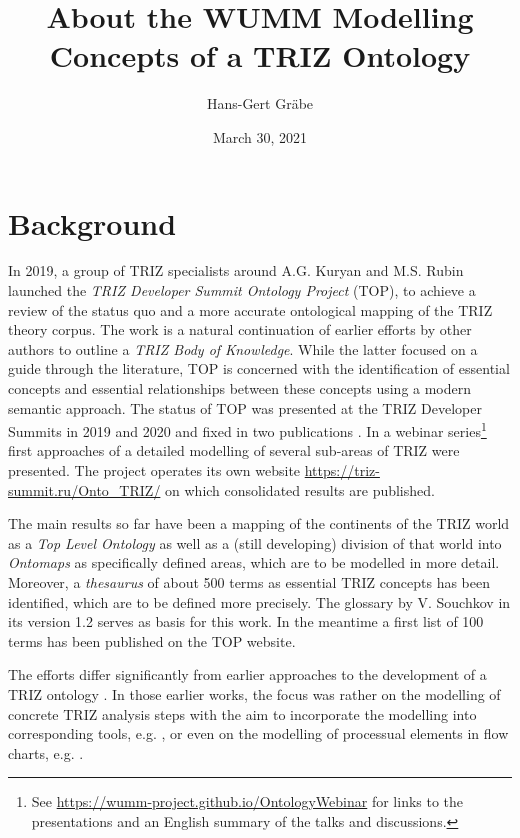 \documentclass[11pt,a4paper]{article}
\title{About the WUMM Modelling Concepts of a TRIZ Ontology}
\author{Hans-Gert Gr\"abe}
\date{March 30,  2021}
\begin{document}
\maketitle

\section{Background}

In 2019, a group of TRIZ specialists around A.G. Kuryan and M.S. Rubin
launched the \emph{TRIZ Developer Summit Ontology Project} (TOP), to achieve a
review of the status quo and a more accurate ontological mapping of the TRIZ
theory corpus. The work is a natural continuation of earlier efforts by other
authors \cite{TBK2007, TBK2012} to outline a \emph{TRIZ Body of Knowledge}.
While the latter focused on a guide through the literature, TOP is concerned
with the identification of essential concepts and essential relationships
between these concepts using a modern semantic approach. The status of TOP was
presented at the TRIZ Developer Summits in 2019 and 2020 and fixed in two
publications \cite{TOP2019, TOP2020}. In a webinar series\footnote{See
  \url{https://wumm-project.github.io/OntologyWebinar} for links to the
  presentations and an English summary of the talks and discussions.}  first
approaches of a detailed modelling of several sub-areas of TRIZ were
presented.  The project operates its own website
\url{https://triz-summit.ru/Onto_TRIZ/} on which consolidated results are
published.

The main results so far have been a mapping of the continents of the TRIZ
world as a \emph{Top Level Ontology} as well as a (still developing) division
of that world into \emph{Ontomaps} as specifically defined areas, which are to
be modelled in more detail. Moreover, a \emph{thesaurus} of about 500 terms as
essential TRIZ concepts has been identified, which are to be defined more
precisely. The glossary \cite{Souchkov2018} by V. Souchkov in its version 1.2
serves as basis for this work. In the meantime a first list of 100 terms
\cite{TOP-Glossary} has been published on the TOP website.

The efforts differ significantly from earlier approaches to the development of
a TRIZ ontology \cite{Bultey2007, Bultey2015, Cavallucci2011, Dubois2007,
  Zanni2009, Zanni2013}. In those earlier works, the focus was rather on the
modelling of concrete TRIZ analysis steps with the aim to incorporate the
modelling into corresponding tools, e.g. \cite{Cavallucci2011}, or even on the
modelling of processual elements in flow charts, e.g. \cite{Bultey2015}.
\end{document}
